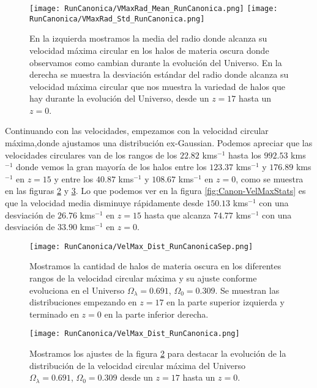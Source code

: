 \begin{figure}[H]
    \centering
    \texttt{[image: RunCanonica/VMaxRad\_Mean\_RunCanonica.png]}
    \texttt{[image: RunCanonica/VMaxRad\_Std\_RunCanonica.png]}
    \caption[Media y desviación estándar del Radio donde se alcanza la velocidad máxima circular]{\footnotesize En la izquierda mostramos la media del radio donde alcanza su velocidad máxima circular en los halos de materia oscura donde observamos como cambian durante la evolución del Universo. En la derecha se muestra la desviación estándar del radio donde alcanza su velocidad máxima circular que nos muestra la variedad de halos que hay durante la evolución del Universo, desde un $z=17$ hasta un $z=0$.}
    \label{fig:Canon-VMaxRadStats}
\end{figure}

Continuando con las velocidades, empezamos con la velocidad circular máxima,{\morado donde ajustamos una distribución ex-Gaussian}. Podemos apreciar que las velocidades circulares van de los rangos de los $22.82$ kms$^{-1}$ hasta los $992.53$ kms$^{-1}$ donde vemos la gran mayoría de los halos entre los $123.37$ kms$^{-1}$ y $176.89$ kms$^{-1}$ en $z=15$ y entre los $40.87$ kms$^{-1}$ y $108.67$ kms$^{-1}$ en $z=0$, como se muestra en las figuras \ref{fig:Canon-VelMaxDistSep} y \ref{fig:Canon-VelMaxDist}. Lo que podemos ver en la figura \ref{fig:Canon-VelMaxStats} es que la velocidad media disminuye rápidamente desde $150.13$ kms$^{-1}$ con una desviación de $26.76$ kms$^{-1}$ en $z=15$ hasta que alcanza $74.77$ kms$^{-1}$ con una desviación de $33.90$ kms$^{-1}$ en $z=0$.

\begin{figure}[H]
    \centering
    \texttt{[image: RunCanonica/VelMax\_Dist\_RunCanonicaSep.png]}
    \caption[Velocidad circular máxima]{\footnotesize Mostramos la cantidad de halos de materia oscura en los diferentes rangos de la velocidad circular máxima y su ajuste conforme evoluciona en el Universo $\Omega_\lambda = 0.691 $, $\Omega_0 = 0.309$. Se muestran las distribuciones empezando en $z=17$ en la parte superior izquierda y terminado en $z=0$ en la parte inferior derecha.}
    \label{fig:Canon-VelMaxDistSep}
\end{figure}

\begin{figure}[H]
    \centering
    \texttt{[image: RunCanonica/VelMax\_Dist\_RunCanonica.png]}
    \caption[Distribución de la velocidad circular máxima]{\footnotesize Mostramos los ajustes de la figura \ref{fig:Canon-VelMaxDistSep} para destacar la evolución de la distribución de la velocidad circular máxima del Universo $\Omega_\lambda = 0.691 $, $\Omega_0 = 0.309$ desde un $z=17$ hasta un $z=0$.}
    \label{fig:Canon-VelMaxDist}
\end{figure}

